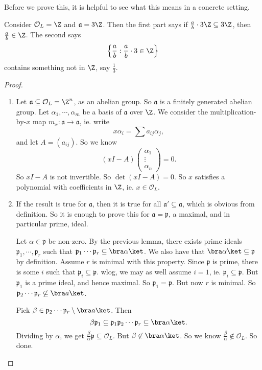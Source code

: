 \documentclass[a4paper]{article}
\begin{document}
Before we prove this, it is helpful to see what this means in a concrete setting.
\begin{eg}
  Consider $\mathcal{O}_L = \Z$ and $\mathfrak{a} = 3\Z$. Then the first part says if $\frac{a}{b} \cdot 3\Z \subseteq 3\Z$, then $\frac{a}{b} \in \Z$. The second says
  \[
    \left\{\frac{a}{b}: \frac{a}{b}\cdot 3 \in \Z\right\}
  \]
  contains something not in $\Z$, say $\frac{1}{3}$.
\end{eg}

\begin{proof}\leavevmode
  \begin{enumerate}
    \item Let $\mathfrak{a} \subseteq \mathcal{O}_L = \Z^n$, as an abelian group. So $\mathfrak{a}$ is a finitely generated abelian group. Let $\alpha_1, \cdots, \alpha_m$ be a basis of $\mathfrak{a}$ over $\Z$. We consider the multiplication-by-$x$ map $m_x: \mathfrak{a} \to \mathfrak{a}$, ie. write
      \[
        x\alpha_i = \sum a_{ij} \alpha_j,
      \]
      and let $A = (a_{ij})$. So we know
      \[
        (xI - A)
        \begin{pmatrix}
          \alpha_1\\\vdots\\ \alpha_n
        \end{pmatrix}
        = 0.
      \]
      So $xI - A$ is not invertible. So $\det(xI - A) = 0$. So $x$ satisfies a polynomial with coefficients in $\Z$, ie. $x \in \mathcal{O}_L$.
    \item If the result is true for $\mathfrak{a}$, then it is true for all $\mathfrak{a}' \subseteq \mathfrak{a}$, which is obvious from definition. So it is enough to prove this for $\mathfrak{a} = \mathfrak{p}$, a maximal, and in particular prime, ideal.

      Let $\alpha \in \mathfrak{p}$ be non-zero. By the previous lemma, there exists prime ideals $\mathfrak{p}_1, \cdots, \mathfrak{p}_r$ such that $\mathfrak{p}_1 \cdots \mathfrak{p}_r \subseteq \bra \alpha\ket$. We also have that $\bra \alpha\ket \subseteq \mathfrak{p}$ by definition. Assume $r$ is minimal with this property. Since $\mathfrak{p}$ is prime, there is some $i$ such that $\mathfrak{p}_i \subseteq \mathfrak{p}$. wlog, we may as well assume $i = 1$, ie. $\mathfrak{p}_i \subseteq \mathfrak{p}$. But $\mathfrak{p}_1$ is a prime ideal, and hence maximal. So $\mathfrak{p}_1 = \mathfrak{p}$. But now $r$ is minimal. So $\mathfrak{p}_2 \cdots \mathfrak{p}_r \not\subseteq \bra a\ket$.

      Pick $\beta \in \mathfrak{p}_2 \cdots \mathfrak{p}_r \setminus \bra a\ket$. Then
      \[
        \beta \mathfrak{p}_1 \subseteq \mathfrak{p}_1 \mathfrak{p}_2 \cdots \mathfrak{p}_r \subseteq \bra \alpha\ket.
      \]
      Dividing by $\alpha$, we get $\frac{\beta}{\alpha}\mathfrak{p} \subseteq \mathcal{O}_L$. But $\beta \not\in \bra \alpha\ket$. So we know $\frac{\beta}{\alpha} \not\in \mathcal{O}_L$. So done.
  \end{enumerate}
\end{proof}
\end{document}
